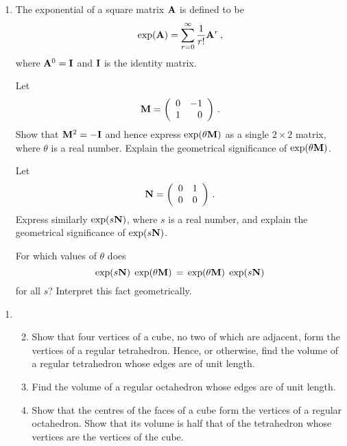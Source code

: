 \documentclass[a4, 11pt]{report}
\newlength{\qspace}
\newcounter{qnumber}
\newenvironment{question}%
 {\vspace{\qspace}
  \begin{enumerate}[\bfseries 1\quad][10]%
    \setcounter{enumi}{\value{qnumber}}%
    \item%
 }
{
  \end{enumerate}
  \filbreak
  \stepcounter{qnumber}
 }
\newenvironment{questionparts}[1][1]%
 {
  \begin{enumerate}[\bfseries (i)]%
    \setcounter{enumii}{#1}
    \addtocounter{enumii}{-1}
    \setlength{\itemsep}{5mm}
    \setlength{\parskip}{8pt}
 }
 {
  \end{enumerate}
 }
\begin{document}
\begin{question}
The exponential of a square matrix ${\bf A}$ is defined to be
$$
\exp ({\bf A}) = \sum_{r=0}^\infty {1\over r!} {\bf A}^r \,,
$$
where ${\bf A}^0={\bf I}$  and  $\bf I$ is the identity matrix. 

Let 
$$
{\bf M}=\left(\begin{array}{cc} 0 & -1 \\ 1 & \phantom{-} 0
\end{array}
\right) \,.
$$
Show that ${\bf M}^2=-{\bf I}$ and hence
 express $\exp({\theta {\bf M}})$ as a single  $2\times 2$ matrix,
where $\theta$ is a real number.
Explain the geometrical significance of $\exp({\theta {\bf M}})$.

Let
 $$
{\bf N}=\left(\begin{array}{rr} 0 & 1 \\ 0 & 0 \end{array}\right) \,.
$$
Express
similarly  $\exp({s{\bf N}})$, where $s$ is  a real number, and
 explain the geometrical significance of $\exp({s{\bf N}})$.

For which values of $\theta$ does
$$
\exp({s{\bf N}})\; \exp({\theta {\bf M}})\,  = \,
\exp({\theta {\bf M}})\;\exp({s{\bf N}})
$$
for all $s$?
Interpret this fact geometrically.
	\end{question}
	
\begin{question}
\begin{questionparts}
\item
Show that four vertices of a cube, no two of which are adjacent,
form the vertices of a regular tetrahedron. 
Hence, or otherwise, find the volume of a regular 
tetrahedron whose edges are of unit length.
\item
Find the volume of a regular octahedron whose edges are of unit length.
\item
Show that the centres of the faces of a cube form the vertices
of a regular octahedron. Show that its volume is half that of the 
tetrahedron whose vertices are the vertices of the cube.
\end{questionparts}

\end{question}
	
\end{document}
